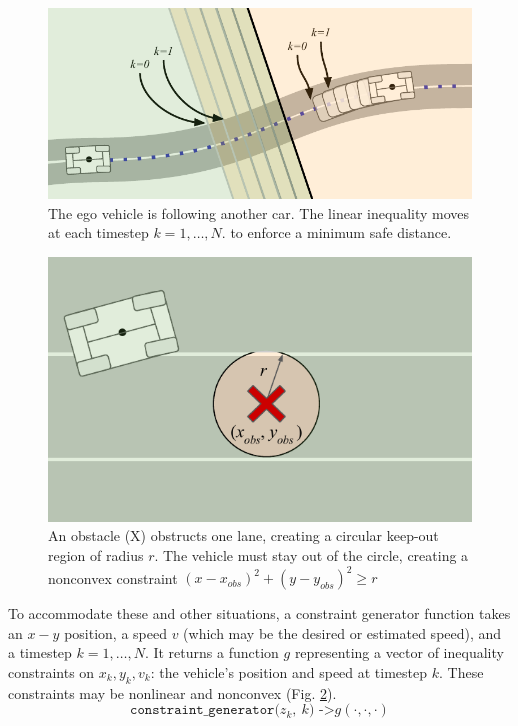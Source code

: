 \documentclass[letterpaper, 10 pt, conference]{ieeeconf}  %
\begin{document}
\begin{figure}[h]
	\centering
	\includegraphics[width=0.9\linewidth]{figures/following.pdf}
	\caption{The ego vehicle is following another car. The linear inequality moves at each timestep $k=1,\dots,N$. to enforce a minimum safe distance.}
	\label{fig:vehicle_in_front}
\end{figure}

\begin{figure}[h]
	\centering
	\includegraphics[width=0.9\linewidth]{figures/obstacle_in_road.pdf}
	\caption{An obstacle (X) obstructs one lane, creating a circular keep-out region of radius $r$. The vehicle must stay out of the circle, creating a nonconvex constraint $(x-x_{obs})^2 + (y-y_{obs})^2 \geq r$}
	\label{fig:obstacle}
\end{figure}


To accommodate these and other situations, a constraint generator function takes an $x-y$ position, a speed $v$ (which may be the desired or estimated speed), and a timestep $k=1,\dots,N$. It returns a function $g$ representing a vector of inequality constraints on $x_k, y_k, v_k$: the vehicle's position and speed at timestep $k$. These constraints may be nonlinear and nonconvex (Fig. \ref{fig:obstacle}).
%
$$\texttt{constraint\_generator($z_k,\ k$) ->} g(\cdot, \cdot, \cdot)$$
\end{document}
